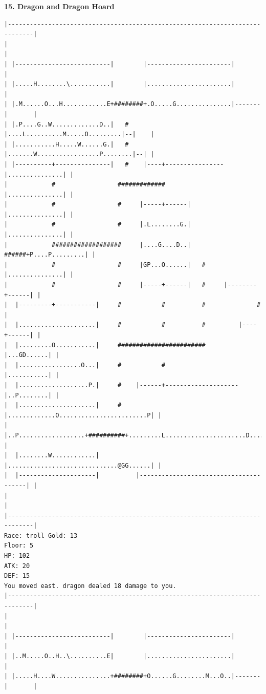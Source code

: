 \documentclass[11pt]{article}
\theoremstyle{plain}
\begin{document}
\newpage
\textbf{15. Dragon and Dragon Hoard }
\begin{Verbatim}[fontsize=\scriptsize]
|-----------------------------------------------------------------------------|
|                                                                             |
| |--------------------------|        |-----------------------|               |
| |.....H........\...........|        |.......................|               |
| |.M......O...H............E+########+.O.....G...............|-------|       |
| |.P....G..W.............D..|   #    |....L..........M.....O.........|--|    |
| |...........H.....W......G.|   #    |.......W.................P........|--| |
| |----------+---------------|   #    |----+----------------|...............| |
|            #                 #############                |...............| |
|            #                 #     |-----+------|         |...............| |
|            #                 #     |.L........G.|         |...............| |
|            ###################     |....G....D..|   ######+P....P.........| |
|            #                 #     |GP...O......|   #     |...............| |
|            #                 #     |-----+------|   #     |--------+------| |
|  |---------+-----------|     #           #          #              #        |
|  |.....................|     #           #          #         |----+------| |
|  |.........O...........|     ########################         |...GD......| |
|  |.................O...|     #           #                    |...........| |
|  |...................P.|     #    |------+--------------------|..P........| |
|  |.....................|     #    |.............O........................P| |
|  |..P..................+##########+.........L......................D......| |
|  |........W............|          |..............................@GG......| |
|  |---------------------|          |---------------------------------------| |
|                                                                             |
|-----------------------------------------------------------------------------|
Race: troll Gold: 13                                                   Floor: 5
HP: 102
ATK: 20
DEF: 15
You moved east. dragon dealed 18 damage to you. 
|-----------------------------------------------------------------------------|
|                                                                             |
| |--------------------------|        |-----------------------|               |
| |..M.....O..H..\..........E|        |.......................|               |
| |.....H....W...............+########+O......G........M...O..|-------|       |

\end{Verbatim}
\end{document}
